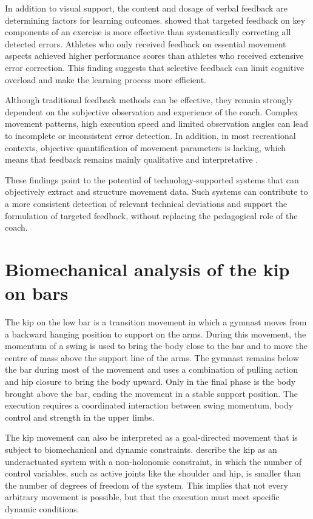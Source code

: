 In addition to visual support, the content and dosage of verbal feedback are determining factors for learning outcomes. \textcite{Niznikowski2025} showed that targeted feedback on key components of an exercise is more effective than systematically correcting all detected errors. Athletes who only received feedback on essential movement aspects achieved higher performance scores than athletes who received extensive error correction. This finding suggests that selective feedback can limit cognitive overload and make the learning process more efficient.

Although traditional feedback methods can be effective, they remain strongly dependent on the subjective observation and experience of the coach. Complex movement patterns, high execution speed and limited observation angles can lead to incomplete or inconsistent error detection. In addition, in most recreational contexts, objective quantification of movement parameters is lacking, which means that feedback remains mainly qualitative and interpretative \autocite{Ota2025Markerless}.

These findings point to the potential of technology-supported systems that can objectively extract and structure movement data. Such systems can contribute to a more consistent detection of relevant technical deviations and support the formulation of targeted feedback, without replacing the pedagogical role of the coach.

\section{Biomechanical analysis of the kip on bars}
\label{sec:Biomechanische-analyse}
The kip on the low bar is a transition movement in which a gymnast moves from a backward hanging position to support on the arms. During this movement, the momentum of a swing is used to bring the body close to the bar and to move the centre of mass above the support line of the arms. The gymnast remains below the bar during most of the movement and uses a combination of pulling action and hip closure to bring the body upward. Only in the final phase is the body brought above the bar, ending the movement in a stable support position. The execution requires a coordinated interaction between swing momentum, body control and strength in the upper limbs.

The kip movement can also be interpreted as a goal-directed movement that is subject to biomechanical and dynamic constraints. \textcite{Yamasaki2010} describe the kip as an underactuated system with a non-holonomic constraint, in which the number of control variables, such as active joints like the shoulder and hip, is smaller than the number of degrees of freedom of the system. This implies that not every arbitrary movement is possible, but that the execution must meet specific dynamic conditions.

